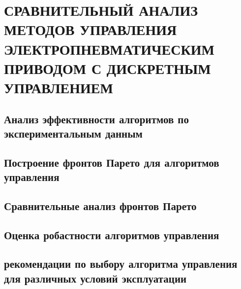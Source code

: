 \chapter{СРАВНИТЕЛЬНЫЙ АНАЛИЗ МЕТОДОВ УПРАВЛЕНИЯ ЭЛЕКТРОПНЕВМАТИЧЕСКИМ ПРИВОДОМ С ДИСКРЕТНЫМ УПРАВЛЕНИЕМ}\label{ch:ch6}

\section{Анализ эффективности алгоритмов по экспериментальным данным}\label{sec:ch6/sec1}

\section{Построение фронтов Парето для алгоритмов управления}\label{sec:ch6/sec2}

\section{Сравнительные анализ фронтов Парето}\label{sec:ch6/sec3}

\section{Оценка робастности алгоритмов управления}\label{sec:ch6/sec4}

\section{рекомендации по выбору алгоритма управления для различных условий эксплуатации}\label{sec:ch6/sec5}

